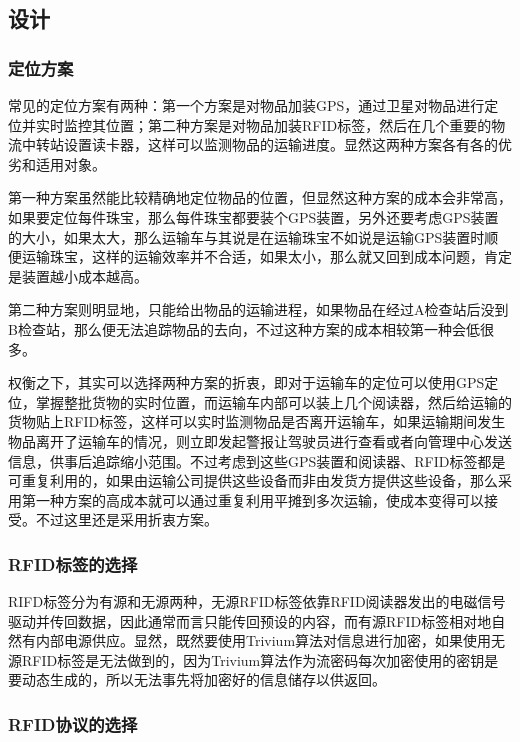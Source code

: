 \subsection{设计}

\subsubsection{定位方案}

常见的定位方案有两种：第一个方案是对物品加装GPS，通过卫星对物品进行定位并实时监控其位置；第二种方案是对物品加装RFID标签，然后在几个重要的物流中转站设置读卡器，这样可以监测物品的运输进度。显然这两种方案各有各的优劣和适用对象。

第一种方案虽然能比较精确地定位物品的位置，但显然这种方案的成本会非常高，如果要定位每件珠宝，那么每件珠宝都要装个GPS装置，另外还要考虑GPS装置的大小，如果太大，那么运输车与其说是在运输珠宝不如说是运输GPS装置时顺便运输珠宝，这样的运输效率并不合适，如果太小，那么就又回到成本问题，肯定是装置越小成本越高。

第二种方案则明显地，只能给出物品的运输进程，如果物品在经过A检查站后没到B检查站，那么便无法追踪物品的去向，不过这种方案的成本相较第一种会低很多。

权衡之下，其实可以选择两种方案的折衷，即对于运输车的定位可以使用GPS定位，掌握整批货物的实时位置，而运输车内部可以装上几个阅读器，然后给运输的货物贴上RFID标签，这样可以实时监测物品是否离开运输车\supercite{邹拥军2013贵重物品的一种防搬动监控系统设计}，如果运输期间发生物品离开了运输车的情况，则立即发起警报让驾驶员进行查看或者向管理中心发送信息，供事后追踪缩小范围。不过考虑到这些GPS装置和阅读器、RFID标签都是可重复利用的，如果由运输公司提供这些设备而非由发货方提供这些设备，那么采用第一种方案的高成本就可以通过重复利用平摊到多次运输，使成本变得可以接受。不过这里还是采用折衷方案。

\subsubsection{RFID标签的选择}

RIFD标签分为有源和无源两种，无源RFID标签依靠RFID阅读器发出的电磁信号驱动并传回数据，因此通常而言只能传回预设的内容，而有源RFID标签相对地自然有内部电源供应。显然，既然要使用Trivium算法对信息进行加密，如果使用无源RFID标签是无法做到的，因为Trivium算法作为流密码每次加密使用的密钥是要动态生成的，所以无法事先将加密好的信息储存以供返回。

\subsubsection{RFID协议的选择}

